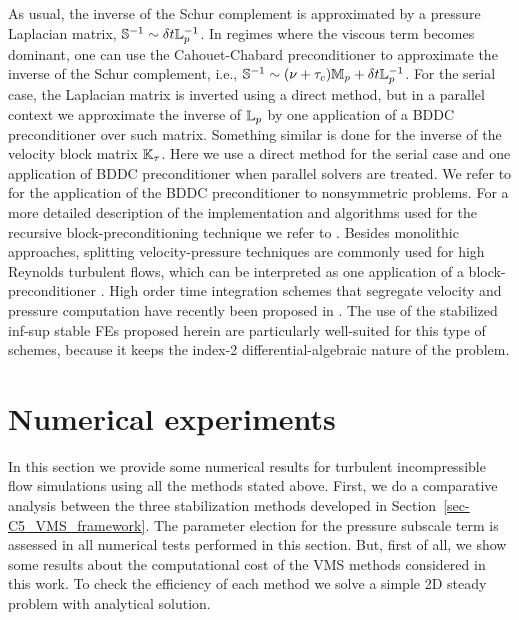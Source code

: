 As usual, the inverse of the Schur complement is approximated by a pressure Laplacian matrix, $\mathbb{S}^{-1}\sim \delta t \mathbb{L}_p^{-1}$. In regimes where the viscous term becomes dominant, one can use the Cahouet-Chabard preconditioner to approximate the inverse of the Schur complement, i.e., $\mathbb{S}^{-1}\sim (\nu+\tau_c)\mathbb{M}_p + \delta t \mathbb{L}_p^{-1}$. For the serial case, the Laplacian matrix is inverted using a direct method, but in a parallel context we approximate the inverse of $\mathbb{L}_p$ by one application of a BDDC preconditioner over such matrix. Something similar is done for the inverse of the velocity block matrix $\mathbb{K}_\tau$. Here we use a direct method for the serial case and one application of BDDC preconditioner when parallel solvers are treated. We refer to \cite{yano_bddc_2010} for the application of the BDDC preconditioner to nonsymmetric problems. For a more detailed description of the implementation and algorithms used for the recursive block-preconditioning technique we refer to \cite{badia_block_2014}. Besides monolithic approaches, splitting velocity-pressure techniques are commonly used for high Reynolds turbulent flows, which can be interpreted as one application of a block-preconditioner \cite{elman_finite_2005,badia_algebraic_2008}. High order time integration schemes that segregate velocity and pressure computation have recently been proposed in \cite{colomes_segregated_2015}. The use of the stabilized inf-sup stable FEs proposed herein are particularly well-suited for this type of schemes, because it keeps the index-2 differential-algebraic nature of the problem. 

\section{Numerical experiments}
\label{sec-C5_experiments}
In this section we provide some numerical results for turbulent incompressible flow simulations using all the methods stated above. First, we do a comparative analysis between the three stabilization methods developed in Section~\ref{sec-C5_VMS_framework}. The parameter election for the pressure subscale term is assessed in all numerical tests performed in this section.
But, first of all, we show some results about the computational cost of the VMS methods considered in this work. To check the efficiency of each method we solve a simple 2D steady problem with analytical solution.

